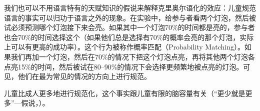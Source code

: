 我们也可以不用语言特有的天赋知识的假说来解释克里奥尔语化的效应：儿童规范语言的事实可以归功于语言之外的现象。在实验中，给参与者看两个灯泡，然后被试必须预测哪个灯泡接下来会亮。如果其中一个灯泡70\%的时间都是亮的，参与者也会70\%的时间选择这个（如果他们总是选择有70\%的概率会亮的那个灯泡，实际上可以有更高的成功率）。这个行为被称作概率匹配（Probability Matching）。如果我们再加一个灯泡，然后在70\%的情况下把这个灯泡点亮，再将其他两个灯泡各点亮15\%的时间，然后被试在80--90\%的情况下会选择更频繁地被点亮的灯泡。可见，他们在最为常见的情况的方向上进行规范\citep{Gardener57a,Weir64a}。

儿童比成人更多地进行规范化\citep{HudsonN99a,HKN2005a}，这个事实跟儿童有限的脑容量有关（“更少就是更多”—假说，\citealp{Newport90a,Elman93a}）。

